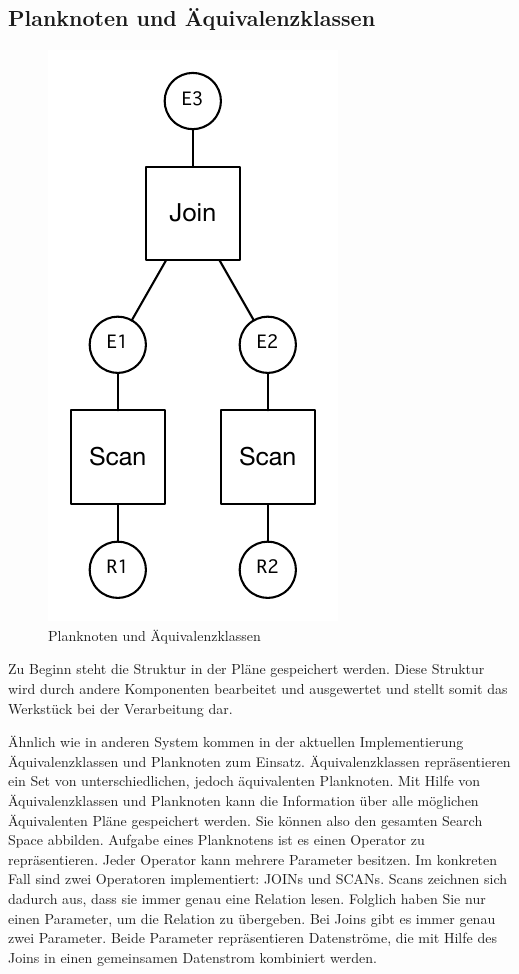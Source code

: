 \subsection{Planknoten und Äquivalenzklassen}





\begin{figure}[h]
  \centering
  \includegraphics{04_Implementierung/JoinScan.pdf}
  \caption{Planknoten und Äquivalenzklassen}
  \label{PlanAequi}
\end{figure}

Zu  Beginn steht die Struktur in der Pläne gespeichert werden. Diese Struktur wird durch andere Komponenten bearbeitet und ausgewertet und stellt somit das Werkstück bei der Verarbeitung dar.

Ähnlich wie in anderen System kommen in der aktuellen Implementierung Äquivalenzklassen und Planknoten zum Einsatz. Äquivalenzklassen repräsentieren ein Set von unterschiedlichen, jedoch äquivalenten Planknoten. Mit Hilfe von Äquivalenzklassen und Planknoten kann die Information über alle möglichen Äquivalenten Pläne gespeichert werden. Sie können also den gesamten Search Space abbilden.
 Aufgabe eines Planknotens ist es einen Operator zu repräsentieren. Jeder Operator kann mehrere Parameter besitzen. Im konkreten Fall sind zwei Operatoren implementiert: JOINs und SCANs. Scans zeichnen sich dadurch aus, dass sie immer genau eine Relation lesen. Folglich haben Sie nur einen Parameter, um die Relation zu übergeben. Bei Joins gibt es immer genau zwei Parameter. Beide Parameter repräsentieren Datenströme, die mit Hilfe des Joins in einen gemeinsamen Datenstrom kombiniert werden.


